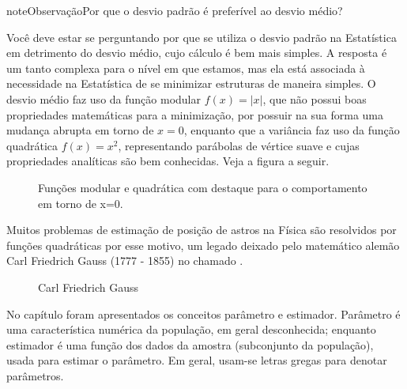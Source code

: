\begin{sphinxadmonition}{note}{Observação}{Por que o desvio padrão é preferível ao desvio médio?}

Você deve estar se perguntando por que se utiliza o desvio padrão na Estatística em detrimento do desvio médio, cujo cálculo é bem mais simples. A resposta é um tanto complexa para o nível em que estamos, mas ela está associada à necessidade na Estatística de se minimizar estruturas de maneira simples. O desvio médio faz uso da função modular \(f(x)=|x|\), que não possui boas propriedades matemáticas para a minimização, por possuir na sua forma uma mudança abrupta em torno de \(x=0\),  enquanto que a variância faz uso da função quadrática \(f(x)=x^2\), representando parábolas de vértice suave e cujas propriedades analíticas são bem conhecidas. Veja a figura a seguir.

\begin{figure}[H]
\centering
\capstart

\noindent{}
\caption{Funções modular e quadrática com destaque para o comportamento em torno de x=0.}\label{\detokenize{PE104-4:fig-coloque-aqui-o-nome}}\label{\detokenize{PE104-4:id6}}\end{figure}

Muitos problemas de estimação de posição de astros na Física são resolvidos por funções quadráticas por esse motivo, um legado deixado pelo matemático alemão Carl Friedrich Gauss (1777 - 1855) no chamado  .

\begin{figure}[H]
\centering
\capstart

\noindent{}
\caption{Carl Friedrich Gauss}\label{\detokenize{PE104-4:id1}}\label{\detokenize{PE104-4:id7}}\end{figure}
\end{sphinxadmonition}


No capítulo  foram apresentados os conceitos parâmetro e estimador. Parâmetro é uma característica numérica da população, em geral desconhecida; enquanto estimador é uma função dos dados da amostra (subconjunto da população), usada para estimar o parâmetro. Em geral, usam-se letras gregas para denotar parâmetros.

